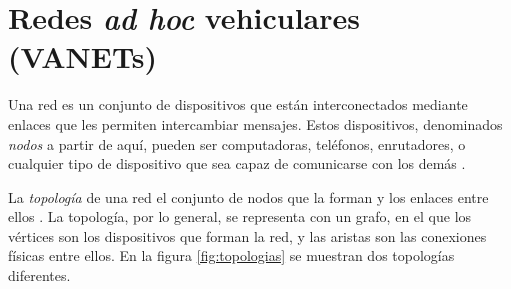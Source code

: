﻿%
\chapter{Redes \textit{ad hoc} vehiculares (VANETs)}

\label{ch:vanets}

% 

Una red es un conjunto de dispositivos que están interconectados mediante
enlaces que les permiten intercambiar mensajes. Estos dispositivos, denominados
\textit{nodos} a partir de aquí, pueden ser computadoras, teléfonos,
enrutadores, o cualquier tipo de dispositivo que sea capaz de comunicarse con
los demás \cite{Marsic2013}.

La \textit{topología} de una red el conjunto de nodos que la forman y los
enlaces entre ellos \cite{Dordal2014}. La topología, por lo general, se
representa con un grafo, en el que los vértices son los dispositivos que forman
la red, y las aristas son las conexiones físicas entre ellos. En la figura
\ref{fig:topologias} se muestran dos topologías diferentes.


